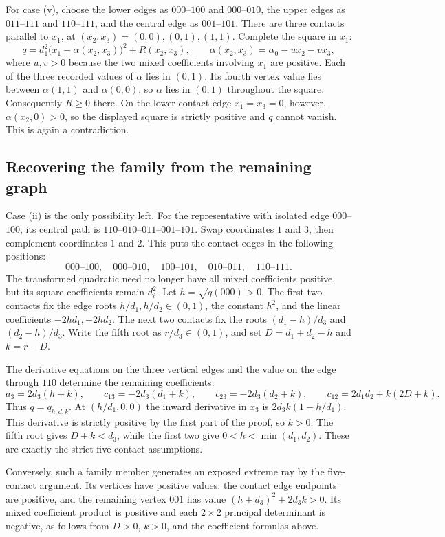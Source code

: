 For case (v), choose the lower edges as $000$--$100$ and $000$--$010$,
the upper edges as $011$--$111$ and $110$--$111$, and the central edge
as $001$--$101$. There are three contacts parallel to $x_1$, at
$(x_2,x_3)=(0,0),(0,1),(1,1)$. Complete the square in $x_1$:
\[
 q=d_1^2\bigl(x_1-\alpha(x_2,x_3)\bigr)^2+R(x_2,x_3),\qquad
 \alpha(x_2,x_3)=\alpha_0-u x_2-v x_3,
\]
where $u,v>0$ because the two mixed coefficients involving $x_1$ are
positive. Each of the three recorded values of $\alpha$ lies in $(0,1)$.
Its fourth vertex value lies between $\alpha(1,1)$ and $\alpha(0,0)$,
so $\alpha$ lies in $(0,1)$ throughout the square. Consequently $R\ge0$
there. On the lower contact edge $x_1=x_3=0$, however,
$\alpha(x_2,0)>0$, so the displayed square is strictly positive and
$q$ cannot vanish. This is again a contradiction.

\subsection{Recovering the family from the remaining graph}

Case (ii) is the only possibility left. For the representative with isolated
edge $000$--$100$, its central path is
$110$--$010$--$011$--$001$--$101$. Swap coordinates $1$ and $3$, then
complement coordinates $1$ and $2$. This puts the contact edges in the
following positions:
\[
 000\text{--}100,\quad000\text{--}010,\quad
 100\text{--}101,\quad010\text{--}011,\quad110\text{--}111.
\]
The transformed quadratic need no longer have all mixed coefficients
positive, but its square coefficients remain $d_i^2$.
Let $h=\sqrt{q(000)}>0$. The first two contacts fix the edge roots
$h/d_1,h/d_2\in(0,1)$, the constant $h^2$, and the linear coefficients
$-2hd_1,-2hd_2$. The next two contacts fix the roots
$(d_1-h)/d_3$ and $(d_2-h)/d_3$.
Write the fifth root as $r/d_3\in(0,1)$, and set
$D=d_1+d_2-h$ and $k=r-D$.

The derivative equations on the three vertical edges and the value on
the edge through $110$ determine the remaining coefficients:
\[
 a_3=2d_3(h+k),\qquad
 c_{13}=-2d_3(d_1+k),\qquad
 c_{23}=-2d_3(d_2+k),\qquad
 c_{12}=2d_1d_2+k(2D+k).
\]
Thus $q=q_{h,d,k}$. At $(h/d_1,0,0)$ the inward derivative in $x_3$ is
$2d_3k(1-h/d_1)$. This derivative is strictly positive by the first part
of the proof, so $k>0$. The fifth root gives $D+k<d_3$,
while the first two give $0<h<\min(d_1,d_2)$. These are exactly the strict
five-contact assumptions.

Conversely, such a family member generates an exposed extreme ray by the
five-contact argument. Its vertices have positive values: the contact
edge endpoints are positive, and the remaining vertex $001$ has value
$(h+d_3)^2+2d_3k>0$. Its mixed coefficient product is positive and each
$2\times2$ principal determinant is negative, as follows from
$D>0$, $k>0$, and the coefficient formulas above.

